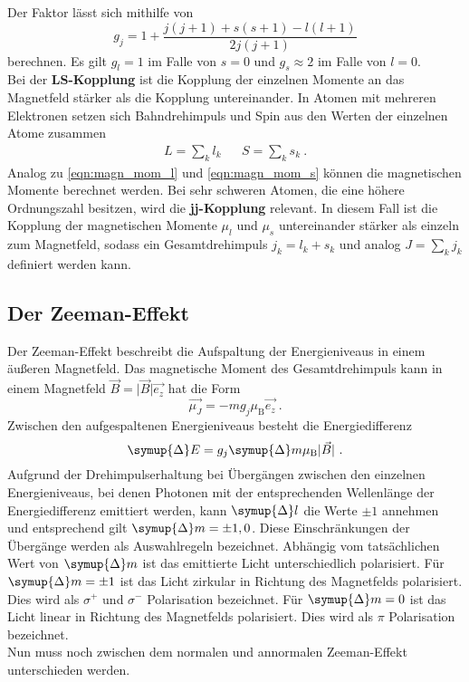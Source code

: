     Der Faktor lässt sich mithilfe von
    \begin{equation}
        g_{j} = 1 + \frac{j(j+1) + s(s+1) - l(l+1)}{2j(j+1)}
        \label{eqn:lande}
    \end{equation}
    berechnen.
    Es gilt $g_l = 1$ im Falle von $s = 0$ und $g_s \approx 2$ im Falle von $l = 0$.\\
    Bei der \textbf{LS-Kopplung} ist die Kopplung der einzelnen Momente an das Magnetfeld stärker als die Kopplung untereinander.
    In Atomen mit mehreren Elektronen setzen sich Bahndrehimpuls und Spin aus den Werten der einzelnen Atome zusammen
    \begin{align}
        L = \sum_k l_k && S = \sum_k s_k \ .
    \end{align}
    Analog zu \autoref{eqn:magn_mom_l} und \autoref{eqn:magn_mom_s} können die magnetischen Momente berechnet werden.
    Bei sehr schweren Atomen,
    die eine höhere Ordnungszahl besitzen,
    wird die \textbf{jj-Kopplung} relevant.
    In diesem Fall ist die Kopplung der magnetischen Momente $\mu_l$ und $\mu_s$ untereinander stärker als einzeln zum Magnetfeld,
    sodass ein Gesamtdrehimpuls $j_k = l_k + s_k$ und analog $J = \sum_k j_k$ definiert werden kann.

\subsection{Der Zeeman-Effekt}

    Der Zeeman-Effekt beschreibt die Aufspaltung der Energieniveaus in einem äußeren Magnetfeld.
    Das magnetische Moment des Gesamtdrehimpuls kann in einem Magnetfeld $\vec{B} = \lvert \vec{B} \rvert \vec{e_z}$ hat die Form
    \begin{equation}
        \vec{\mu_J} = - m g_j \mu_\text{B} \vec{e_z} \ .
    \end{equation}
    Zwischen den aufgespaltenen Energieniveaus besteht die Energiedifferenz
    \begin{equation}
        \symup{\Delta} E = g_j \symup{\Delta} m \mu_\text{B} \lvert \vec{B} \rvert \ .
        \label{eqn:energiedifferenz}
    \end{equation}
    Aufgrund der Drehimpulserhaltung bei Übergängen zwischen den einzelnen Energieniveaus,
    bei denen Photonen mit der entsprechenden Wellenlänge der Energiedifferenz emittiert werden,
    kann $\symup{\Delta} l$ die Werte $\pm 1$ annehmen und entsprechend gilt $\symup{\Delta} m = \pm 1, 0$.
    Diese Einschränkungen der Übergänge werden als Auswahlregeln bezeichnet.
    Abhängig vom tatsächlichen Wert von $\symup{\Delta} m$ ist das emittierte Licht unterschiedlich polarisiert.
    Für $\symup{\Delta} m = \pm 1$ ist das Licht zirkular in Richtung des Magnetfelds polarisiert.
    Dies wird als $\sigma^+$ und $\sigma^-$ Polarisation bezeichnet.
    Für $\symup{\Delta} m = 0$ ist das Licht linear in Richtung des Magnetfelds polarisiert.
    Dies wird als $\pi$ Polarisation bezeichnet.\\
    Nun muss noch zwischen dem normalen und annormalen Zeeman-Effekt unterschieden werden.

